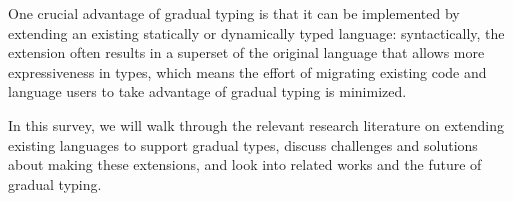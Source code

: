 One crucial advantage of gradual typing is that it can be implemented
by extending an existing statically or dynamically typed language:
syntactically, the extension often results in a superset of the original
language that allows more expressiveness in types, which means
the effort of migrating existing code and language users
to take advantage of gradual typing is minimized.

In this survey, we will walk through the relevant research literature on extending
existing languages to support gradual types,
discuss challenges and solutions about making these extensions,
and look into related works and the future of gradual typing.